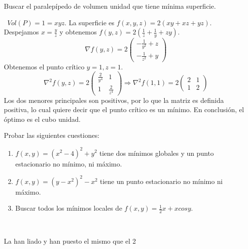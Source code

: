 \documentclass[twoside]{article}
\begin{document}
\begin{ejercicio}{7}
Buscar el paralepípedo de volumen unidad que tiene mínima superficie. 

\begin{solucion}\
$Vol(P)=1=xyz$. La superficie es $f(x,y,z)=2(xy+xz+yz)$. Despejamos $x=\frac{y}{z}$ y obtenemos $f(y,z)=2(\frac{1}{z}+\frac{1}{y}+zy)$. 
$$\nabla f(y,z)=2\begin{pmatrix}
-\frac{1}{y^2}+z\\
-\frac{1}{z^2}+y
\end{pmatrix}$$
Obtenemos el punto crítico $y=1,z=1$.
$$\nabla^2f(y,z)=2\begin{pmatrix}
\frac{2}{y^4} & 1\\
1 & \frac{2}{z^4}
\end{pmatrix}\Rightarrow \nabla^2f(1,1)=2\begin{pmatrix}
2 & 1\\
1 & 2
\end{pmatrix}$$
Los dos menores principales son positivos, por lo que la matriz es definida positiva, lo cual quiere decir que el  punto crítico es un mínimo. En conclusión, el óptimo es el cubo unidad.
\end{solucion}
\end{ejercicio}

\newpage 

\begin{ejercicio}{8}
Probar las siguientes cuestiones:
\begin{enumerate}
\item $f(x,y)=(x^2-4)^2+y^2$ tiene dos mínimos globales y un punto estacionario no mínimo, ni máximo.
\item $f(x,y)=(y-x^2)^2-x^2$ tiene un punto estacionario no mínimo ni máximo.
\item Buscar todos los mínimos locales de $f(x,y)=\frac{1}{2}x+xcosy$.
\end{enumerate}

\begin{solucion}\
\end{solucion}
\end{ejercicio}

\newpage 

\begin{ejercicio}{9}
La han liado y han puesto el mismo que el 2
\begin{solucion}\
\end{solucion}
\end{ejercicio}

\newpage 
\end{document}
